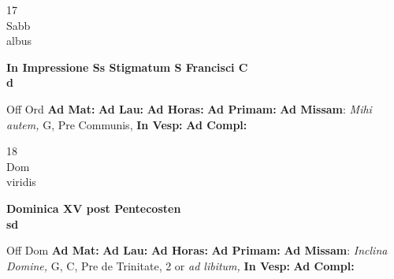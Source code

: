 \documentclass[10pt, openany]{book}
\begin{document}
    \begin{center}
        \begin{minipage}{3.5in}
            \vspace{2em}
            \begin{minipage}{0.5in}
                {\Huge 17} \\
                {\normalsize Sabb} \\
                {\normalsize albus}
            \end{minipage}
            \begin{minipage}{3.0in}
                \textbf{ \large In Impressione Ss Stigmatum S Francisci C \\
                \textnormal{\normalsize d}} \\ 
            \end{minipage}
            \begin{justify}Off Ord
                \textbf{Ad Mat: }
                \textbf{Ad Lau: }
                \textbf{Ad Horas: }
                \textbf{Ad Primam: }\textbf{Ad Missam}: \textit{Mihi autem,} G, Pre Communis,  
                \textbf{In Vesp: }
                \textbf{Ad Compl: }
            \end{justify}
        \end{minipage}
    \end{center}

    \begin{center}
        \begin{minipage}{3.5in}
            \vspace{2em}
            \begin{minipage}{0.5in}
                {\Huge 18} \\
                {\normalsize Dom} \\
                {\normalsize viridis}
            \end{minipage}
            \begin{minipage}{3.0in}
                \textbf{ \large Dominica XV post Pentecosten \\
                \textnormal{\normalsize sd}} \\ 
            \end{minipage}
            \begin{justify}Off Dom
                \textbf{Ad Mat: }
                \textbf{Ad Lau: }
                \textbf{Ad Horas: }
                \textbf{Ad Primam: }\textbf{Ad Missam}: \textit{Inclina Domine,} G, C, Pre de Trinitate, 2 or \textit{ad libitum,}  
                \textbf{In Vesp: }
                \textbf{Ad Compl: }
            \end{justify}
        \end{minipage}
    \end{center}
\end{document}

